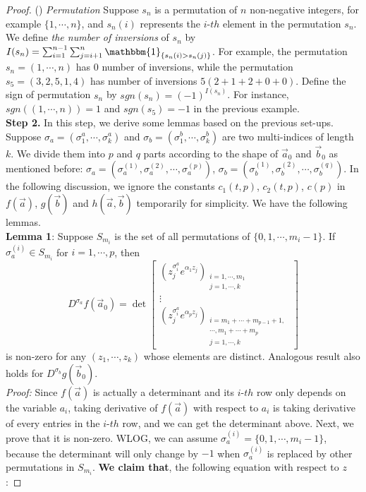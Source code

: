 \begin{proof}
() \emph{Permutation} Suppose $s_{n}$ is a permutation of $n$ non-negative integers, for example $\{1,\cdots,n\}$, and $s_{n}(i)$ represents the $i$-$th$ element in the permutation $s_{n}$. We define \emph{the number of inversions} of $s_{n}$ by $I(s_{n})=\sum_{i=1}^{n-1}\sum_{j=i+1}^{n}\mathbbm{1}_{\{s_{n}(i)>s_{n}(j)\}}$. For example, the permutation $s_{n}=(1,\cdots,n)$ has $0$ number of inversions, while the permutation $s_{5}=(3,2,5,1,4)$ has number of inversions $5(2+1+2+0+0)$. Define the sign of permutation $s_{n}$ by $sgn(s_{n})=(-1)^{I(s_{n})}$. For instance, $sgn((1,\cdots,n))=1$ and $sgn(s_{5})=-1$ in the previous example.\\
\textbf{Step 2. }In this step, we derive some lemmas based on the previous set-ups. Suppose $\sigma_{a}=(\sigma_{1}^{a},\cdots,\sigma_{k}^{a})$ and $\sigma_{b}=(\sigma_{1}^{b},\cdots,\sigma_{k}^{b})$ are two multi-indices of length $k$. We divide them into $p$ and $q$ parts according to the shape of $\vec{a}_{0}$ and $\vec{b}_{0}$ as mentioned before: $\sigma_{a}=(\sigma^{(1)}_{a},\sigma^{(2)}_{a},\cdots,\sigma^{(p)}_{a})$, $\sigma_{b}=(\sigma^{(1)}_{b},\sigma^{(2)}_{b},\cdots,\sigma^{(q)}_{b})$. In the following discussion, we ignore the constants $c_{1}(t,p)$, $c_{2}(t,p)$, $c(p)$ in $f(\vec{a})$, $g(\vec{b})$ and $h(\vec{a},\vec{b})$ temporarily for simplicity. We have the following lemmas.\\
\textbf{Lemma 1}: Suppose $S_{m_i}$ is the set of all permutations of $\{0,1,\cdots,m_{i}-1\}$. If $\sigma_{a}^{(i)}\in S_{m_i}$ for $i=1,\cdots,p$, then 
\[ D^{\sigma_{a}}f(\vec{a}_{0})= \det
	\left[ \begin{array}{ccc}
		(z_{j}^{\sigma_{i}^{a}}e^{\alpha_{1}z_{j}})_{\substack{i=1,\cdots,m_{1}\\j=1,\cdots,k}}\\
	\vdots\\
	(z_{j}^{\sigma_{i}^{a}}e^{\alpha_{p}z_{j}})_{\substack{i=m_1+\cdots+m_{p-1}+1,\\ \cdots ,m_{1}+\cdots +m_{p} \\j=1,\cdots,k}}
	\end{array}
	\right]
\]
is non-zero for any $(z_{1},\cdots,z_{k})$ whose elements are distinct. Analogous result also holds for $D^{\sigma_{b}}g(\vec{b}_{0})$.\\
\emph{Proof: }Since $f(\vec{a})$ is actually a determinant and its $i$-$th$ row only depends on the variable $a_{i}$, taking derivative of $f(\vec{a})$ with respect to $a_{i}$ is taking derivative of every entries in the $i$-$th$ row, and we can get the determinant above. Next, we prove that it is non-zero. WLOG, we can assume $\sigma_{a}^{(i)}=\{0,1,\cdots,m_{i}-1\}$, because the determinant will only change by $-1$ when $\sigma_{a}^{(i)}$ is replaced by other permutations in $S_{m_i}$. \textbf{We claim that}, the following equation with respect to $z$:

\end{proof}
